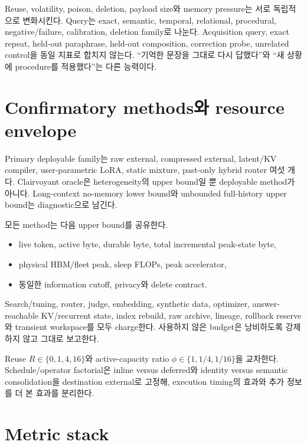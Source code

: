 Reuse, volatility, poison, deletion, payload size와 memory pressure는 서로 독립적으로 변화시킨다. Query는
exact, semantic, temporal, relational, procedural, negative/failure, calibration, deletion family로 나눈다.
Acquisition query, exact repeat, held-out paraphrase, held-out composition, correction probe, unrelated control을
동일 지표로 합치지 않는다. ``기억한 문장을 그대로 다시 답했다''와 ``새 상황에 procedure를 적용했다''는
다른 능력이다.

\section{Confirmatory methods와 resource envelope}

Primary deployable family는 raw external, compressed external, latent/KV compiler, user-parametric LoRA,
static mixture, past-only hybrid router 여섯 개다. Clairvoyant oracle은 heterogeneity의 upper bound일 뿐
deployable method가 아니다. Long-context no-memory lower bound와 unbounded full-history upper bound는
diagnostic으로 남긴다.

모든 method는 다음 upper bound를 공유한다.

\begin{itemize}
  \item live token, active byte, durable byte, total incremental peak-state byte,
  \item physical HBM/fleet peak, sleep FLOPs, peak accelerator,
  \item 동일한 information cutoff, privacy와 delete contract.
\end{itemize}

Search/tuning, router, judge, embedding, synthetic data, optimizer, answer-reachable KV/recurrent state, index
rebuild, raw archive, lineage, rollback reserve와 transient workspace를 모두 charge한다. 사용하지 않은 budget은
낭비하도록 강제하지 않고 그대로 보고한다.

Reuse $R\in\{0,1,4,16\}$와 active-capacity ratio
$\phi\in\{1,1/4,1/16\}$을 교차한다. Schedule/operator factorial은 inline versus deferred와 identity
versus semantic consolidation을 destination external로 고정해, execution timing의 효과와 추가 정보를 더
본 효과를 분리한다.

\section{Metric stack}

